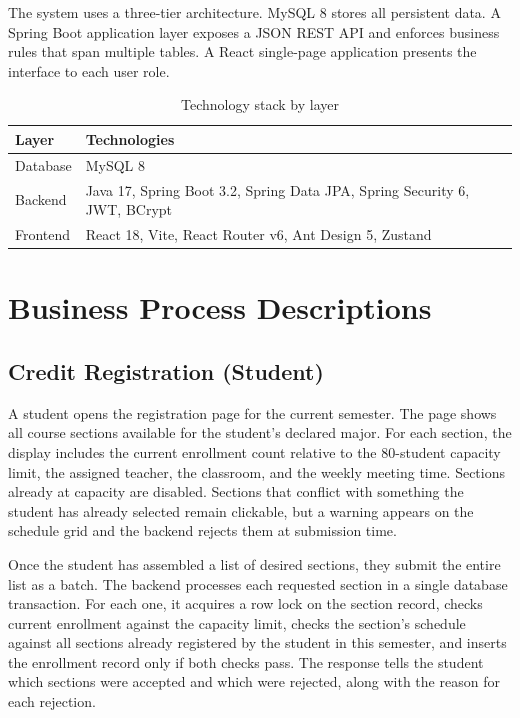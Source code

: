\documentclass[12pt,a4paper]{report}
\begin{document}
The system uses a three-tier architecture. MySQL 8 stores all persistent data. A Spring Boot application layer exposes a JSON REST API and enforces business rules that span multiple tables. A React single-page application presents the interface to each user role.

\begin{table}[H]
\renewcommand{\arraystretch}{1.35}
\caption{Technology stack by layer}
\label{tab:stack}
\begin{tabular}{|p{3cm}|p{10.7cm}|}
  \hline
  \textbf{Layer} & \textbf{Technologies} \\
  \hline
  Database & MySQL 8 \\
  \hline
  Backend & Java 17, Spring Boot 3.2, Spring Data JPA, Spring Security 6, JWT, BCrypt \\
  \hline
  Frontend & React 18, Vite, React Router v6, Ant Design 5, Zustand \\
  \hline
\end{tabular}
\end{table}

\section{Business Process Descriptions}

\subsection{Credit Registration (Student)}

A student opens the registration page for the current semester. The page shows all course sections available for the student's declared major. For each section, the display includes the current enrollment count relative to the 80-student capacity limit, the assigned teacher, the classroom, and the weekly meeting time. Sections already at capacity are disabled. Sections that conflict with something the student has already selected remain clickable, but a warning appears on the schedule grid and the backend rejects them at submission time.

Once the student has assembled a list of desired sections, they submit the entire list as a batch. The backend processes each requested section in a single database transaction. For each one, it acquires a row lock on the section record, checks current enrollment against the capacity limit, checks the section's schedule against all sections already registered by the student in this semester, and inserts the enrollment record only if both checks pass. The response tells the student which sections were accepted and which were rejected, along with the reason for each rejection.
\end{document}
